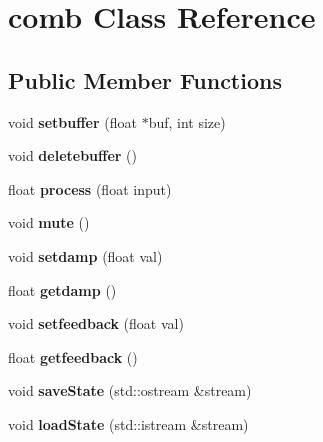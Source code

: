 \hypertarget{classcomb}{\section{comb Class Reference}
\label{classcomb}
}
\subsection*{Public Member Functions}
\begin{DoxyCompactItemize}
\item 
\hypertarget{classcomb_a000d3f031781c27ceaf487a1ec957fec}{void {\bfseries setbuffer} (float $\ast$buf, int size)}\label{classcomb_a000d3f031781c27ceaf487a1ec957fec}

\item 
\hypertarget{classcomb_a4dd1f6c7ae8cf781c26599d8e023d41d}{void {\bfseries deletebuffer} ()}\label{classcomb_a4dd1f6c7ae8cf781c26599d8e023d41d}

\item 
\hypertarget{classcomb_a49755386062cccd51ae9eb43ae00a317}{float {\bfseries process} (float input)}\label{classcomb_a49755386062cccd51ae9eb43ae00a317}

\item 
\hypertarget{classcomb_ae18d1b1ea26d1c18087d3d8feeb7145d}{void {\bfseries mute} ()}\label{classcomb_ae18d1b1ea26d1c18087d3d8feeb7145d}

\item 
\hypertarget{classcomb_abd0aa594882431e7f7eb4901fcc0ea5e}{void {\bfseries setdamp} (float val)}\label{classcomb_abd0aa594882431e7f7eb4901fcc0ea5e}

\item 
\hypertarget{classcomb_a99e2c5952a08d006902f5e20a05d37a7}{float {\bfseries getdamp} ()}\label{classcomb_a99e2c5952a08d006902f5e20a05d37a7}

\item 
\hypertarget{classcomb_ad8fac09822db8d944c13791112b5b6a2}{void {\bfseries setfeedback} (float val)}\label{classcomb_ad8fac09822db8d944c13791112b5b6a2}

\item 
\hypertarget{classcomb_a1df81e7e8f9310831e4e7929078f1d11}{float {\bfseries getfeedback} ()}\label{classcomb_a1df81e7e8f9310831e4e7929078f1d11}

\item 
\hypertarget{classcomb_ab6b7006d95b9b1d9397dbf9c22d8a981}{void {\bfseries save\-State} (std\-::ostream \&stream)}\label{classcomb_ab6b7006d95b9b1d9397dbf9c22d8a981}

\item 
\hypertarget{classcomb_a4accb964763281cf365e24fb2b1c70ec}{void {\bfseries load\-State} (std\-::istream \&stream)}\label{classcomb_a4accb964763281cf365e24fb2b1c70ec}

\end{DoxyCompactItemize}



